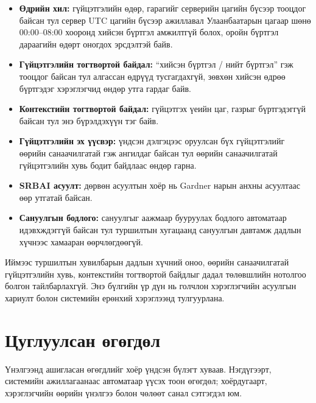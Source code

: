 \begin{itemize}
    \item \textbf{Өдрийн хил:} гүйцэтгэлийн өдөр, гарагийг серверийн цагийн бүсээр тооцдог байсан тул сервер UTC цагийн бүсээр ажиллавал Улаанбаатарын цагаар шөнө 00:00--08:00 хооронд хийсэн бүртгэл амжилтгүй болох, оройн бүртгэл дараагийн өдөрт оногдох эрсдэлтэй байв.
    \item \textbf{Гүйцэтгэлийн тогтвортой байдал:} ``хийсэн бүртгэл / нийт бүртгэл'' гэж тооцдог байсан тул алгассан өдрүүд тусгагдахгүй, зөвхөн хийсэн өдрөө бүртгэдэг хэрэглэгчид өндөр утга гардаг байв.
    \item \textbf{Контекстийн тогтвортой байдал:} гүйцэтгэх үеийн цаг, газрыг бүртгэдэггүй байсан тул энэ бүрэлдэхүүн тэг байв.
    \item \textbf{Гүйцэтгэлийн эх үүсвэр:} үндсэн дэлгэцээс оруулсан бүх гүйцэтгэлийг өөрийн санаачилгатай гэж ангилдаг байсан тул өөрийн санаачилгатай гүйцэтгэлийн хувь бодит байдлаас өндөр гарна.
    \item \textbf{SRBAI асуулт:} дөрвөн асуултын хоёр нь Gardner нарын анхны асуултаас өөр утгатай байсан.
    \item \textbf{Сануулгын бодлого:} сануулгыг аажмаар бууруулах бодлого автоматаар идэвхждэггүй байсан тул туршилтын хугацаанд сануулгын давтамж дадлын хүчнээс хамааран өөрчлөгдөөгүй.
\end{itemize}

Иймээс туршилтын хувилбарын дадлын хүчний оноо, өөрийн санаачилгатай гүйцэтгэлийн хувь, контекстийн тогтвортой байдлыг дадал төлөвшлийн нотолгоо болгон тайлбарлахгүй. Энэ бүлгийн үр дүн нь голчлон хэрэглэгчийн асуулгын хариулт болон системийн ерөнхий хэрэглээнд тулгуурлана.

\section{Цуглуулсан өгөгдөл}

Үнэлгээнд ашигласан өгөгдлийг хоёр үндсэн бүлэгт хуваав. Нэгдүгээрт, системийн ажиллагаанаас автоматаар үүсэх тоон өгөгдөл; хоёрдугаарт, хэрэглэгчийн өөрийн үнэлгээ болон чөлөөт санал сэтгэгдэл юм.

